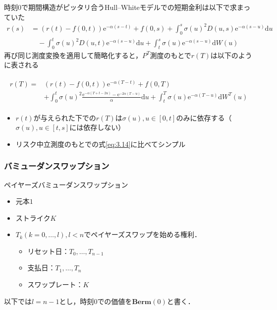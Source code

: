 \documentclass[a4paper, lualatex, ja=standard]{bxjsarticle}
\theoremstyle{theorem}
\theoremstyle{definition}
\theoremstyle{definition}
\newcommand{\Berm}{\mathbf{Berm}}
\newcommand{\diff}{\mathrm{d}}
\begin{document}
時刻$0$で期間構造がピッタリ合うHull--Whiteモデルでの短期金利は以下で求まっていた
\begin{equation}
  \begin{aligned}
    r(s) &=  (r(t)-f(0, t)) \mathrm{e}^{-\alpha(s-t)}+f(0, s)+\int_0^s \sigma(u)^2 D(u, s) \mathrm{e}^{-\alpha(s-u)} \diff u  \\
    &\quad -\int_0^t \sigma(u)^2 D(u, t) \mathrm{e}^{-\alpha(s-u)} \diff u+\int_t^s \sigma(u) \mathrm{e}^{-\alpha(s-u)} \diff W(u)  
  \end{aligned}
  \tag{3.14}
  \label{eq:3.14}
\end{equation}
再び同じ測度変換を適用して簡略化すると，$P^T$測度のもとで$r(T)$は以下のように表される

\begin{align}
\begin{aligned}
r(T)= & (r(t)-f(0, t)) \mathrm{e}^{-\alpha(T-t)}+f(0, T) \\
& +\int_0^t \sigma(u)^2 \frac{\mathrm{e}^{-\alpha(T+t-2 u)}-\mathrm{e}^{-2 \alpha(T-u)}}{\alpha} \diff  u+\int_t^T \sigma(u) \mathrm{e}^{-\alpha(T-u)} \diff  W^T(u)
\end{aligned}
\label{eq:3.29}
\end{align}

\begin{itemize}
  \item $r(t)$が与えられた下での$r(T)$は$\sigma(u), u\in[0,t]$のみに依存する（$\sigma(u), u\in[t,s]$には依存しない）
  \item リスク中立測度のもとでの式\eqref{eq:3.14}に比べてシンプル
\end{itemize}


\subsubsection*{バミューダンスワップション}
ペイヤーズバミューダンスワップション
\begin{itemize}
  \item 元本$1$
  \item ストライク$K$
  \item $T_k(k=0, \ldots, l),l<n$でペイヤーズスワップを始める権利．
  \begin{itemize}
    \item リセット日：$T_0, \ldots, T_{n-1}$
    \item 支払日：$T_1, \ldots, T_n$
    \item スワップレート：$K$
  \end{itemize}
\end{itemize}
以下では$l=n-1$とし，時刻$0$での価値を$\Berm(0)$と書く．
\end{document}
